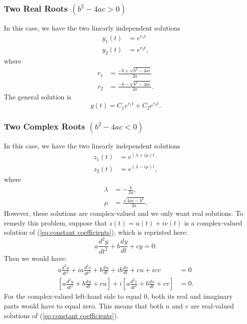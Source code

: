 \documentclass{myart}
\newcommand{\eq}[1]{(\ref{eq:#1})}
\newcommand{\deriv}[3][]{\frac{d^{#1}#2}{d#3^{#1}}}
\begin{document}
\subsubsection{Two Real Roots
  \texorpdfstring{$(b^2 - 4ac > 0)$}{(b^2 - 4ac > 0)}}
\label{subsubsec:constant coefficients real roots}

In this case, we have the two linearly independent solutions
\begin{align*}
  y_1(t) &= e^{r_1t} \\
  y_2(t) &= e^{r_2t},
\end{align*}
where
\begin{align*}
  r_1 &= \frac{-b + \sqrt{b^2 - 4ac}}{2a} \\
  r_2 &= \frac{-b - \sqrt{b^2 - 4ac}}{2a}.
\end{align*}
The general solution is
\begin{equation*}
  y(t) = C_1e^{r_1t} + C_2e^{r_2t}.
\end{equation*}

\subsubsection{Two Complex Roots
  \texorpdfstring{$(b^2 - 4ac < 0)$}{(b^2 - 4ac < 0)}}
\label{subsubsec:constant coefficients complex roots}

In this case, we have the two linearly independent solutions
\begin{align*}
  z_1(t) &= e^{(\lambda + i\mu)t} \\
  z_2(t) &= e^{(\lambda - i\mu)t},
\end{align*}
where
\begin{align*}
  \lambda &= -\frac{b}{2a}, \\
  \mu &= \frac{\sqrt{4ac - b^2}}{2a}.
\end{align*}
However, these solutions are complex-valued and we only want real
solutions. To remedy this problem, suppose that $z(t) = u(t) + iv(t)$
is a complex-valued solution of \eq{constant coefficients}, which is
reprinted here:
\begin{equation*}
  a \deriv[2]{y}{t} + b \deriv{y}{t} + cy = 0.
\end{equation*}
Then we would have:
\begin{align*}
    a \deriv[2]{u}{t} + ia \deriv[2]{v}{t}
  + b \deriv   {u}{t} + ib \deriv   {v}{t}
  + cu + icv &= 0 \\
     \left[a \deriv[2]{u}{t} + b \deriv{u}{t} + cu\right]
  + i\left[a \deriv[2]{v}{t} + b \deriv{v}{t} + cv\right] &= 0.
\end{align*}
For the complex-valued left-hand side to equal $0$, both its real and
imaginary parts would have to equal zero. This means that both $u$ and
$v$ are real-valued solutions of \eq{constant coefficients}.
\end{document}

